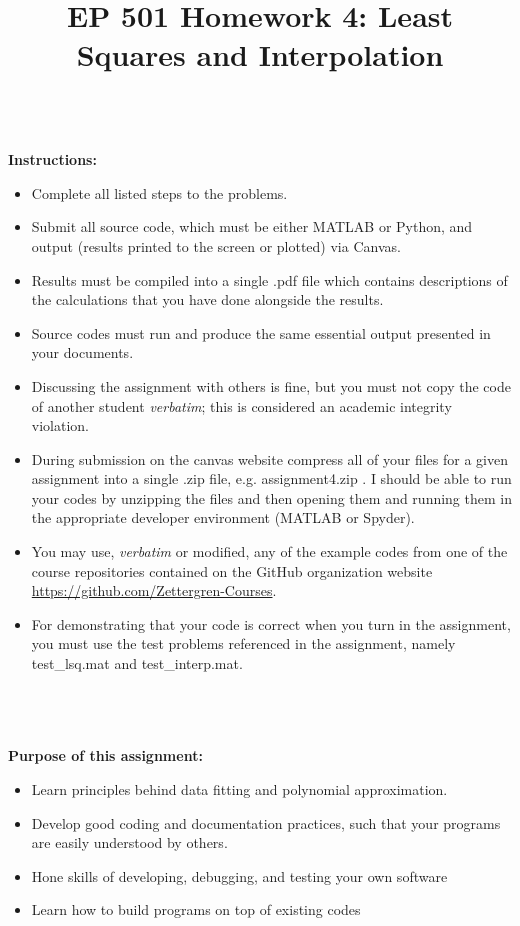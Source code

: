 \documentclass{article}
\begin{document}
\title{EP 501 Homework 4:  Least Squares and Interpolation}

\maketitle

~\\
\textbf{Instructions:}  
\begin{itemize}
  \item Complete all listed steps to the problems.
  \item Submit all source code, which must be either MATLAB or Python, and output (results printed to the screen or plotted) via Canvas.  
  \item Results must be compiled into a single .pdf file which contains descriptions of the calculations that you have done alongside the results.  
  \item Source codes must run and produce the same essential output presented in your documents.  
  \item Discussing the assignment with others is fine, but you must not copy the code of another student \emph{verbatim}; this is considered an academic integrity violation.  
  \item During submission on the canvas website compress all of your files for a given assignment into a single .zip file, e.g. \textsf{assignment4.zip} .  I should be able to run your codes by unzipping the files and then opening them and running them in the appropriate developer environment (MATLAB or Spyder).  
  \item You may use, \emph{verbatim} or modified, any of the example codes from one of the course repositories contained on the GitHub organization website  \url{https://github.com/Zettergren-Courses}. 
  \item For demonstrating that your code is correct when you turn in the assignment, you must use the test problems referenced in the assignment, namely \textsf{test\_lsq.mat} and \textsf{test\_interp.mat}.  

\end{itemize}
~\\~\\~\\
\textbf{Purpose of this assignment:}  
\begin{itemize}
  \item Learn principles behind data fitting and polynomial approximation.  
  \item Develop good coding and documentation practices, such that your programs are easily understood by others.  
  \item Hone skills of developing, debugging, and testing your own software
  \item Learn how to build programs on top of existing codes
\end{itemize}
\end{document}
